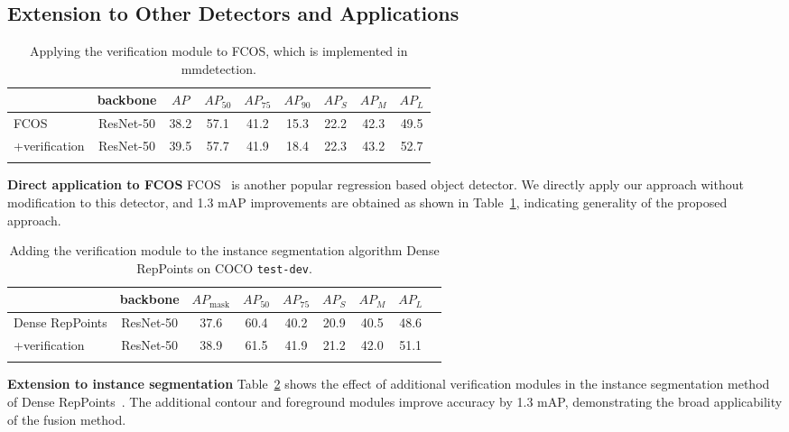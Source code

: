 \documentclass{article}
\begin{document}
\subsection{Extension to Other Detectors and Applications}

\begin{table}
  \caption{Applying the verification module to FCOS, which is implemented in mmdetection.}
  \small
  \label{tab:asfcos}
  \centering
  \begin{tabular}{lcccccccc}
    \Xhline{1.0pt}
    & backbone & $AP$ & $AP_{50}$ & $AP_{75}$ & $AP_{90}$ & $AP_S$ & $AP_M$ & $AP_L$\\
    \hline
    FCOS & ResNet-50 & 38.2 & 57.1 & 41.2 & 15.3 & 22.2 & 42.3 & 49.5\\
    +verification & ResNet-50 & 39.5 & 57.7 & 41.9 & 18.4 & 22.3 & 43.2 & 52.7\\
    \Xhline{1.0pt}
  \end{tabular}
  \vspace{-1em}
\end{table}

\textbf{Direct application to FCOS} FCOS~\cite{tian2019fcos} is another popular regression based object detector. We directly apply our approach without modification to this detector, and 1.3 mAP improvements are obtained as shown in Table~\ref{tab:asfcos}, indicating generality of the proposed approach.
 
\begin{table}
  \caption{Adding the verification module to the instance segmentation algorithm Dense RepPoints on COCO \texttt{test-dev}.}
  \small
  \label{tab:insseg}
  \centering
  \begin{tabular}{lcccccccc}
    \Xhline{1.0pt}
     & backbone & $AP_\text{mask}$ & $AP_{50}$ & $AP_{75}$ & $AP_{S}$ & $AP_{M}$ & $AP_{L}$\\
    \hline
    Dense RepPoints & ResNet-50 & 37.6 & 60.4 & 40.2 & 20.9 & 40.5 & 48.6\\
    +verification & ResNet-50 & 38.9 & 61.5 & 41.9 & 21.2 & 42.0 & 51.1\\
    \Xhline{1.0pt}
  \end{tabular}
\end{table}

\textbf{Extension to instance segmentation} Table~\ref{tab:insseg} shows the effect of additional verification modules in the instance segmentation method of Dense RepPoints~\cite{yang19densereppts}. The additional contour and foreground modules improve accuracy by 1.3 mAP, demonstrating the broad applicability of the fusion method.
\end{document}

